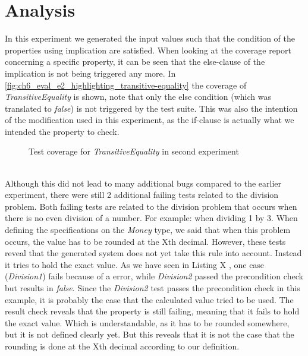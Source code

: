 \section{Analysis}
In this experiment we generated the input values such that the condition of the properties using implication are satisfied. When looking at the coverage report concerning a specific property, it can be seen that the else-clause of the implication is not being triggered any more. In \autoref{fig:ch6_eval_e2_highlighting_transitive-equality} the coverage of \textit{TransitiveEquality} is shown, note that only the else condition (which was translated to \textit{false}) is not triggered by the test suite. This was also the intention of the modification used in this experiment, as the if-clause is actually what we intended the property to check.
\\
\begin{figure}[h!]
\caption{Test coverage for \textit{TransitiveEquality} in second experiment}
\label{fig:ch6_eval_e2_highlighting_transitive-equality}
\centering
\end{figure}
\\
Although this did not lead to many additional bugs compared to the earlier experiment, there were still 2 additional failing tests related to the division problem. Both failing tests are related to the division problem that occurs when there is no even division of a number. For example: when dividing 1 by 3. When defining the specifications on the \textit{Money} type, we said that when this problem occurs, the value has to be rounded at the Xth  decimal. However, these tests reveal that the generated system does not yet take this rule into account. Instead it tries to hold the exact value. As we have seen in Listing X , one case (\textit{Division1}) fails because of a  error, while \textit{Division2} passed the precondition check but results in \textit{false}. Since the \textit{Division2} test passes the precondition check in this example, it is probably the case that the calculated value tried to be used. The result check reveals that the property is still failing, meaning that it fails to hold the exact value. Which is understandable, as it has to be rounded somewhere, but it is not defined clearly yet. But this reveals that it is not the case that the rounding is done at the Xth  decimal according to our definition.

